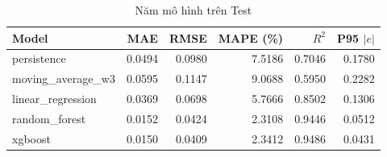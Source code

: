 \begin{table}[H]\centering\small
\caption{Năm mô hình trên Test}\label{tab:w10-test}
\begin{tabular}{lrrrrr}\toprule
Model & MAE & RMSE & MAPE (\%) & $R^2$ & P95 $|e|$ \\\midrule
persistence & 0.0494 & 0.0980 & 7.5186 & 0.7046 & 0.1780 \\
moving\_average\_w3 & 0.0595 & 0.1147 & 9.0688 & 0.5950 & 0.2282 \\
linear\_regression & 0.0369 & 0.0698 & 5.7666 & 0.8502 & 0.1306 \\
random\_forest & 0.0152 & 0.0424 & 2.3108 & 0.9446 & 0.0512 \\
xgboost & 0.0150 & 0.0409 & 2.3412 & 0.9486 & 0.0431 \\
\bottomrule\end{tabular}
\end{table}
